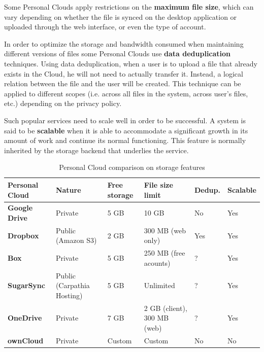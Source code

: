 Some Personal Clouds apply restrictions on the \textbf{maximum file size}, which can vary depending on whether the file is synced on the desktop application or uploaded through the web interface, or even the type of account.

In order to optimize the storage and bandwidth consumed when maintaining different versions of files some Personal Clouds use \textbf{data deduplication} techniques. Using data deduplication, when a user is to upload a file that already exists in the Cloud, he will not need to actually transfer it. Instead, a logical relation between the file and the user will be created. This technique can be applied to different scopes (i.e. across all files in the system, across user's files, etc.) depending on the privacy policy.

Such popular services need to scale well in order to be successful. A system is said to be \textbf{scalable} when it is able to accommodate a significant growth in its amount of work and continue its normal functioning. This feature is normally inherited by the storage backend that underlies the service.

\begin{table}
\begin{center}
    \begin{tabular}{ | p{3cm} | p{1.8cm} | p{1.5cm} | p{2.6cm} | p{1.3cm} | p{1.5cm} | }
    \hline
    \rowcolor[gray]{0.8}

	\textbf{Personal Cloud} &
	\textbf{Nature} &
	\textbf{Free storage} &
	\textbf{File size limit} & 
	\textbf{Dedup.} & 
	\textbf{Scalable} \\ \hline

	\textbf{Google Drive} &
	Private &
	5 GB &
	10 GB &
	No &
	Yes \\ \hline

	\textbf{Dropbox} &
	Public (Amazon S3) &
	2 GB &
	300 MB (web only) &
	Yes &
	Yes \\ \hline
	
	
	\textbf{Box} &
	Private &
	5 GB & 
	250 MB (free acounts) &
	? &
	Yes \\ \hline
	
	\textbf{SugarSync} & 
	Public (Carpathia Hosting) &
	5 GB &
	Unlimited &
	? &
	Yes \\ \hline
	
	\textbf{OneDrive} & 
	Private &
	7 GB &
	2 GB (client), 300 MB (web) &
	? &
	Yes \\ \hline
	
	\textbf{ownCloud} &
	Private &
	Custom &
	Custom &
	No &
	No \\ \hline

    \end{tabular}
    \\[10pt]
    \caption{Personal Cloud comparison on storage features}
    \label{tab:pc_storage}
\end{center}
\end{table}

